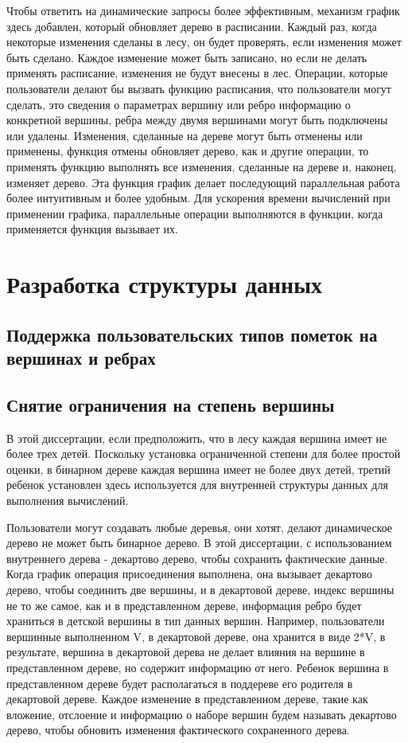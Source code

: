 \documentclass[specification,annotation,times]{itmo-student-thesis}
\newcommand{\revise}[1]{{\color{red!70!black} #1 }}
\begin{document}
\revise{
Чтобы ответить на динамические запросы более эффективным, механизм график здесь добавлен, который обновляет дерево в расписании. Каждый раз, когда некоторые изменения сделаны в лесу, он будет проверять, 
если изменения может быть сделано. Каждое изменение может быть записано, но если не делать применять расписание, изменения не будут внесены в лес. Операции, которые пользователи делают бы вызвать функцию 
расписания, что пользователи могут сделать, это сведения о параметрах вершину или ребро информацию о конкретной вершины, ребра между двумя вершинами могут быть подключены или удалены. Изменения, сделанные 
на дереве могут быть отменены или применены, функция отмены обновляет дерево, как и другие операции, то применять функцию выполнять все изменения, сделанные на дереве и, наконец, изменяет дерево. Эта 
функция график делает последующий параллельная работа более интуитивным и более удобным. Для ускорения времени вычислений при применении графика, параллельные операции выполняются в функции, когда 
применяется функция вызывает их.
}

\chapterconclusion

\chapter{Разработка структуры данных}

\section{Поддержка пользовательских типов пометок на вершинах и ребрах}

\section{Снятие ограничения на степень вершины}

\revise{
В этой диссертации, если предположить, что в лесу каждая вершина имеет не более трех детей. Поскольку установка ограниченной степени для более простой оценки, в бинарном дереве каждая вершина имеет не 
более двух детей, третий ребенок установлен здесь используется для внутренней структуры данных для выполнения вычислений.
}

\revise{
Пользователи могут создавать любые деревья, они хотят, делают динамическое дерево не может быть бинарное дерево. В этой диссертации, с использованием внутреннего дерева - декартово дерево, чтобы сохранить 
фактические данные. Когда график операция присоединения выполнена, она вызывает декартово дерево, чтобы соединить две вершины, и в декартовой дереве, индекс вершины не то же самое, как и в представленном 
дереве, информация ребро будет храниться в детской вершины в тип данных вершин. Например, пользователи вершинные выполненном V, в декартовой дереве, она хранится в виде 2*V, в результате, вершина в 
декартовой дерева не делает влияния на вершине в представленном дереве, но содержит информацию от него. Ребенок вершина в представленном дереве будет располагаться в поддереве его родителя в декартовой 
дереве. Каждое изменение в представленном дереве, такие как вложение, отслоение и информацию о наборе вершин будем называть декартово дерево, чтобы обновить изменения фактического сохраненного дерева.
}
\end{document}
